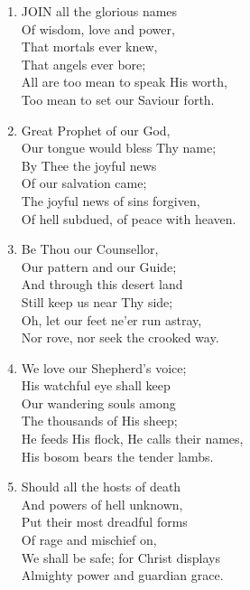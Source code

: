 \begin{enumerate}
    \item JOIN all the glorious names \\
        Of wisdom, love and power, \\
        That mortals ever knew, \\
        That angels ever bore; \\
        All are too mean to speak His worth, \\
        Too mean to set our Saviour forth.

    \item Great Prophet of our God, \\
        Our tongue would bless Thy name; \\
        By Thee the joyful news \\
        Of our salvation came; \\
        The joyful news of sins forgiven, \\
        Of hell subdued, of peace with heaven.

    \item Be Thou our Counsellor, \\
        Our pattern and our Guide; \\
        And through this desert land \\
        Still keep us near Thy side; \\
        Oh, let our feet ne'er run astray, \\
        Nor rove, nor seek the crooked way.

    \item We love our Shepherd's voice; \\
        His watchful eye shall keep \\
        Our wandering souls among \\
        The thousands of His sheep; \\
        He feeds His flock, He calls their names, \\
        His bosom bears the tender lambs.

    \item Should all the hosts of death \\
        And powers of hell unknown, \\
        Put their most dreadful forms \\
        Of rage and mischief on, \\
        We shall be safe; for Christ displays \\
        Almighty power and guardian grace.

\end{enumerate}

